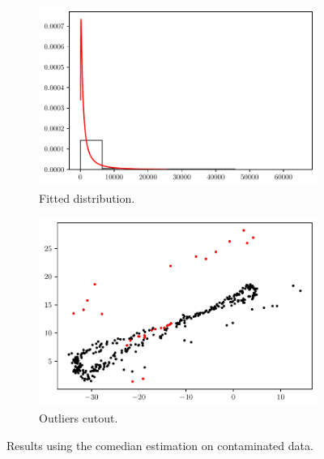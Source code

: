 \documentclass[11pt]{article}
\theoremstyle{definition}
\theoremstyle{remark}
\theoremstyle{remark}
\begin{document}
\begin{figure}[H]
  \centering
  \begin{subfigure}[t]{0.475\textwidth}
    \centering
    \includegraphics[scale=0.45]{../figs/comedian_hist_with-noise.pdf}
    \caption{Fitted distribution.}
  \end{subfigure}
  \begin{subfigure}[t]{0.475\textwidth}
    \centering
    \includegraphics[scale=0.45]{../figs/comedian_scatter_with-noise.pdf}
    \caption{Outliers cutout.}
  \end{subfigure}
  \caption{Results using the comedian estimation on contaminated
    data.}
  \label{fig:comedian_cut_wnoise}
\end{figure}
\end{document}
